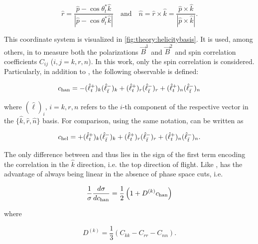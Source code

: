 \begin{equation}
    \hat{r} = \frac{\hat{p} - \cos \theta^*_t \hat{k}} {| \hat{p} - \cos \theta^*_t \hat{k} |} \quad \mathrm{and} \quad \hat{n} = \hat{r} \times \hat{k} = \frac{\hat{p} \times \hat{k}} {| \hat{p} \times \hat{k} |}.
\end{equation}

This coordinate system is visualized in \cref{fig:theory:helicitybasis}. It is used, among others, in  to measure both the polarizations $\vec{B}^1$ and $\vec{B}^2$ and spin correlation coefficients $C_{ij}$ ($i,j = k,r,n$). In this work, only the spin correlation is considered. Particularly, in addition to \chel, the following observable is defined:

\begin{equation}
    \label{eq:theory:chan}
    c_{\mathrm{han}} = - (\hat{\ell}_t^+)_k (\hat{\ell}_{\bar{t}}^-)_k + (\hat{\ell}_t^+)_r (\hat{\ell}_{\bar{t}}^-)_r + (\hat{\ell}_t^+)_n (\hat{\ell}_{\bar{t}}^-)_n
\end{equation}

\noindent where $(\hat{\ell})_i$, $i=k,r,n$ refers to the $i$-th component of the respective vector in the $\{\hat{k},\hat{r},\hat{n}\}$ basis. For comparison, using the same notation, \chel can be written as

\begin{equation}
    \label{eq:theory:chel_components}
    c_{\mathrm{hel}} = + (\hat{\ell}_t^+)_k (\hat{\ell}_{\bar{t}}^-)_k + (\hat{\ell}_t^+)_r (\hat{\ell}_{\bar{t}}^-)_r + (\hat{\ell}_t^+)_n (\hat{\ell}_{\bar{t}}^-)_n .
\end{equation}

The only difference between \chel and \chan thus lies in the sign of the first term encoding the correlation in the $\hat{k}$ direction, i.e. the top direction of flight.
Like \chel, \chan has the advantage of always being linear in the absence of phase space cuts, i.e.

\begin{equation}
    \frac{1}{\sigma} \frac{d \sigma}{d c_{\mathrm{han}}} = \frac{1}{2}\left( 1 + D^{(k)} c_{\mathrm{han}} \right)
\end{equation}

\noindent where~\cite{Maltoni:2024tul}

\begin{equation}
\label{eq:theory:Dk}
    D^{(k)} = \frac{1}{3} \left( C_{kk} - C_{rr} - C_{nn} \right) .
\end{equation}

